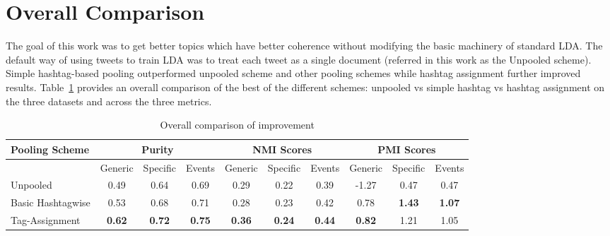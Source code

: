 \documentclass{sig-alternate}
\begin{document}
\section*{Overall Comparison}

\label{sec:overall}

The goal of this work was to get better topics which have better
coherence without modifying the basic machinery of standard LDA. The
default way of using tweets to train LDA was to treat each tweet as a
single document (referred in this work as the Unpooled scheme). Simple
hashtag-based pooling outperformed unpooled scheme and other pooling
schemes while hashtag assignment further improved
results. Table~\ref{tbl-10} provides an overall comparison of the best
of the different schemes: unpooled vs simple hashtag vs hashtag
assignment on the three datasets and across the three metrics.

\begin{table}[!ht]
\centering
{
	\begin{tabular}{|l|ccc|ccc|ccc|}
	\hline
	Pooling Scheme  & \multicolumn {3}{c}{Purity} & \multicolumn {3}{c}{NMI Scores} & \multicolumn {3}{c|}{PMI Scores}\\
	\hline
	 & Generic & Specific & Events &  Generic & Specific & Events &  Generic & Specific & Events\\
	\hline
	Unpooled & 0.49 & 0.64 & 0.69 & 0.29 & 0.22 & 0.39 & -1.27 & 0.47 & 0.47 \\
	\hline
	Basic Hashtagwise & 0.53 & 0.68 & 0.71 & 0.28 & 0.23 & 0.42 & 0.78 & \textbf{1.43} & \textbf{1.07} \\
	\hline
	Tag-Assignment & \textbf{0.62} & \textbf{0.72} & \textbf{0.75} & \textbf{0.36} & \textbf{0.24} & \textbf{0.44} & \textbf{0.82} & 1.21 & 1.05 \\
	\hline
	\end{tabular}
}
\caption{ Overall comparison of improvement}\label{tbl-10}
\end{table}
\end{document}

